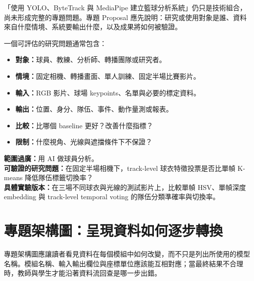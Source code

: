 \documentclass[11pt,a4paper,oneside]{report}
\begin{document}
\begin{conceptBox}
「使用 YOLO、ByteTrack 與 MediaPipe 建立籃球分析系統」仍只是技術組合，尚未形成完整的專題問題。專題 Proposal 應先說明：研究或使用對象是誰、資料來自什麼情境、系統要輸出什麼，以及成果將如何被驗證。
\end{conceptBox}

一個可評估的研究問題通常包含：

\begin{itemize}
  \item \textbf{對象：}球員、教練、分析師、轉播團隊或研究者。
  \item \textbf{情境：}固定相機、轉播畫面、單人訓練、固定半場比賽影片。
  \item \textbf{輸入：}RGB 影片、球場 keypoints、名單與必要的標定資料。
  \item \textbf{輸出：}位置、身分、隊伍、事件、動作量測或報表。
  \item \textbf{比較：}比哪個 baseline 更好？改善什麼指標？
  \item \textbf{限制：}什麼視角、光線與遮擋條件下不保證？
\end{itemize}

\begin{plainBox}
\textbf{範圍過廣：}用 AI 做球員分析。\\
\textbf{可驗證的研究問題：}在固定半場相機下，track-level 球衣特徵投票是否比單幀 K-means 降低隊伍標籤切換率？\\
\textbf{具體實驗版本：}在三場不同球衣與光線的測試影片上，比較單幀 HSV、單幀深度 embedding 與 track-level temporal voting 的隊伍分類準確率與切換率。
\end{plainBox}

\clearpage
\section{專題架構圖：呈現資料如何逐步轉換}

專題架構圖應讓讀者看見資料在每個模組中如何改變，而不只是列出所使用的模型名稱。模組名稱、輸入輸出欄位與座標單位應該能互相對應；當最終結果不合理時，教師與學生才能沿著資料流回查是哪一步出錯。
\end{document}
